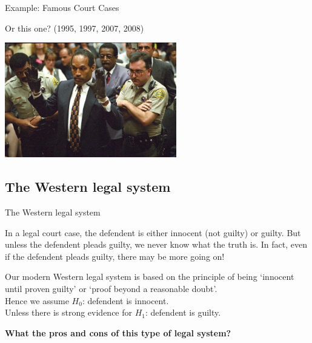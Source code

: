 \documentclass[t,xcolor=pdftex,dvipsnames,table]{beamer}\usepackage[]{graphicx}\usepackage[]{color}
\begin{document}
\begin{frame}[fragile]{Example: Famous Court Cases}

Or this one? (1995, 1997, 2007, 2008)
\href{https://en.wikipedia.org/wiki/O._J._Simpson}{}
\begin{center}
\includegraphics[height=5cm]{../images/OJSimpson.jpg}
\end{center}
\end{frame}




\subsection[]{The Western legal system}
\begin{frame}[fragile]{The Western legal system}

In a legal court case, the defendent is either innocent (not guilty) or guilty. But unless the defendent pleads guilty, we never know what the truth is. In fact, even if the defendent pleads guilty, there may be more going on!

\vspace{.5cm}
Our modern Western legal system is based on the principle of being ‘innocent until proven guilty’ or ‘proof beyond a reasonable doubt’.  \\
Hence we assume $H_{0}$: defendent is innocent. \\
Unless there is strong evidence for $H_{1}$: defendent is guilty.

\vspace{.5cm}
{\bf What the pros and cons of this type of legal system?}

\end{frame}
\end{document}
